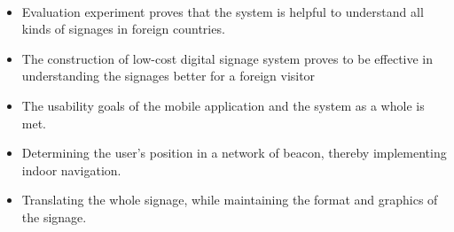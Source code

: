 \documentclass[12pt]{article}
\begin{document}
\paragraph{}

\begin{itemize}
	\item Evaluation experiment proves that the system is helpful to understand all kinds of signages in foreign countries. 
	\item The construction of low-cost digital signage system proves to be effective in understanding the signages better for a foreign visitor
	\item The usability goals of the mobile application and the system as a whole is met.
\end{itemize}


\begin{itemize}
	\item Determining the user's position in a network of beacon, thereby implementing indoor navigation.
	\item Translating the whole signage, while maintaining the format and graphics of the signage. 
\end{itemize}


\cleardoublepage
{}


\end{document}

